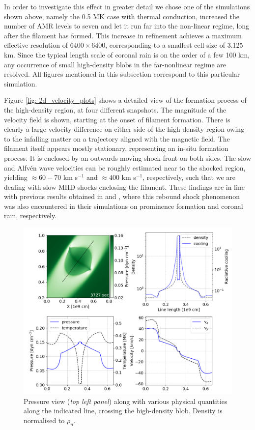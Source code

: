 In order to investigate this effect in greater detail we chose one of the simulations shown above, namely the 0.5 MK case with thermal conduction, increased the number of AMR levels to seven and let it run far into the non-linear regime, long after the filament has formed. This increase in refinement achieves a maximum effective resolution of $6400 \times 6400$, corresponding to a smallest cell size of 3.125 km. Since the typical length scale of coronal rain is on the order of a few 100 km, any occurrence of small high-density blobs in the far-nonlinear regime are resolved. All figures mentioned in this subsection correspond to this particular simulation.



Figure \ref{fig: 2d_velocity_plots} shows a detailed view of the formation process of the high-density region, at four different snapshots. The magnitude of the velocity field is shown, starting at the onset of filament formation. There is clearly a large velocity difference on either side of the high-density region owing to the infalling matter on a trajectory aligned with the magnetic field. The filament itself appears mostly stationary, representing an in-situ formation process. It is enclosed by an outwards moving shock front on both sides. The slow and Alfv\'en wave velocities can be roughly estimated near to the shocked region, yielding $\approx 60-70$ km s$^{-1}$ and $\approx 400$ km s$^{-1}$, respectively, such that we are dealing with slow MHD shocks enclosing the filament. These findings are in line with previous results obtained in \citet{xia2012} and \citet{fang2015}, where this rebound shock phenomenon was also encountered in their simulations on prominence formation and coronal rain, respectively.

\begin{figure}[t]
  \centering
  \includegraphics[width=\textwidth]{2d_lineplots.png}
  \caption{
    Pressure view (\emph{top left panel}) along with various physical quantities along the indicated line, crossing the high-density blob. Density is normalised to $\rho_n$.
  }
  \label{fig: 2d_lineplots}
\end{figure}

